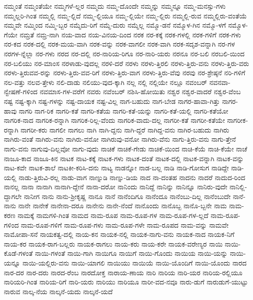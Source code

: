 {ನಮ್ಮಂತೆ
ನಮ್ಮಂತೆಯೇ
ನಮ್ಮಗಳೆ-ಲ್ಲರ
ನಮ್ಮದು
ನಮ್ಮ-ದೊಂದೇ
ನಮ್ಮನ್ನು
ನಮ್ಮನ್ನೂ
ನಮ್ಮ-ಮನಸ್ಸು-ಗಳು
ನಮ್ಮಲ್ಲರಿ-ಗಿಂತ
ನಮ್ಮಲ್ಲಿ
ನಮ್ಮ-ಲ್ಲಿದೆ
ನಮ್ಮ-ಲ್ಲಿಯೂ
ನಮ್ಮ-ಲ್ಲಿಯೇ
ನಮ್ಮ-ಲ್ಲಿರು
ನಮ್ಮಲ್ಲಿ-ರುವ
ನಮ್ಮಲ್ಲಿರು-ವಂತೆಯೆ
ನಮ್ಮವೇ
ನಮ್ಮಿಂದ
ನಮ್ಮಿ-ಬ್ಬರ
ನಮ್ಮೆದು-ರಿಗೆ
ನಮ್ಮೆ-ದುರು
ನಮ್ಮೆಲ್ಲ
ನಮ್ಮೊ-ಡನೆ
ನಮ್ಮೊಳ-ಗಿನ
ನಮ್ಮೊ-ಳಗೆ
ನಮ್ಮೊಳ-ಗೆಯೇ
ನಮ್ರತೆ
ನಮ್ರ-ನಾಗಿ
ನಯ-ವಾದ
ನಯ-ವಿನಯ-ದಿಂದ
ನರಕ
ನರ-ಕಕ್ಕೆ
ನರಕ-ಗಳಲ್ಲಿ
ನರಕ-ಗಳಿಗೆ
ನರಕ-ಗಳು
ನರ-ಕದ
ನರಕ-ದಲ್ಲಿ
ನರಕ-ಮಯ-ವಾಗಿ
ನರಕ-ವನ್ನು
ನರಕ-ವಾಗಲೀ
ನರಕ-ವಾಗಿ
ನರಕ-ಸದೃಶ-ವನ್ನಾಗಿ
ನರ-ಗಳ
ನರಗಳ-ನ್ನೆಲ್ಲಾ
ನರ-ಗಳು
ನರದ
ನರ-ದಲ್ಲಿ
ನರ-ನಾರಿಯ-ರಿಗೂ
ನರ-ನಾರಿ-ಯರು
ನರನೂ
ನರ-ಬಲಿ
ನರಬಲಿ-ಯಿಂದ
ನರ-ಬಲಿಯು
ನರ-ಮಾಂಸ
ನರಳಾಡು-ವುದಲ್ಲ
ನರಳಿ-ದರೆ
ನರಳು
ನರಳು-ತ್ತಿರಲಿ
ನರಳು-ತ್ತಿರು-ವನು
ನರಳು-ತ್ತಿರು-ವರು
ನರಳು-ತ್ತಿರುವವ-ರನ್ನು
ನರಳು-ತ್ತಿರು-ವವ-ರಿಗೆ
ನರಳು-ತ್ತಿರು-ವಾಗ
ನರಳು-ತ್ತಿರು-ವೆವು
ನರವು
ನರ-ಶ್ರೇಷ್ಠನೆ
ನರಿ-ಗಳಿಗೆ
ನಲ-ವತ್ತು
ನಲವ-ತ್ತೇಳು
ನಲಿ-ದಾಡು
ನಲಿಯು-ವುದ-ಕ್ಕಾಗಿ
ನಲ್ಲ
ನಲ್ಲಿ
ನಲ್ಲಿಯೇ
ನಲ್ಲೂ
ನವಂಬರ್
ನವನವಾ-ನ್ವೇಷಣೆ-ಗಳಿಂದ
ನವಮಾಸ-ಗಳ-ವರೆಗೆ
ನವರು
ನವೆಂಬರ್
ನಶಿಸಿ-ಹೋಯಿತು
ನಶ್ವರ
ನಶ್ವರ-ವಾದರೆ
ನಶ್ವರ-ವೆಂಬ
ನಷ್ಟ
ನಷ್ಟ-ಕ್ಕಾಗಿ
ನಷ್ಟ-ಗಳನ್ನು
ನಷ್ಟ-ದಾಯಕ
ನಷ್ಟ-ವಿಲ್ಲ
ನಾಗ-ಬಹುದು
ನಾಗ-ಬೇಡ
ನಾಗರ-ಹಾವಾ-ಗಿತ್ತು
ನಾಗರ-ಹಾವು
ನಾಗರಿ
ನಾಗ-ರಿಕ
ನಾಗರಿ-ಕತೆ
ನಾಗರಿ-ಕತೆಯ
ನಾಗರಿ-ಕತೆ-ಯನ್ನು
ನಾಗರಿ-ಕತೆ-ಯಲ್ಲಿ
ನಾಗರಿ-ಕತೆಯೋ
ನಾಗರಿಕ-ನಾದ
ನಾಗರಿಕ-ರನ್ನಾಗಿ
ನಾಗರಿಕ-ರಿಲ್ಲ-ವೆಂದು
ನಾಗರಿಕ-ವಾದು-ದಲ್ಲ
ನಾಗರೀ-ಕತೆ
ನಾಗರೀ-ಕತೆಯೇ
ನಾಗರೀಕ-ರನ್ನಾಗಿ
ನಾಗರೀ-ಕರು
ನಾಗಲೀ
ನಾಗಲು
ನಾಗಿ
ನಾಗಿ-ದ್ದನು
ನಾಗಿ-ದ್ದರೆ
ನಾಗಿದ್ದ-ವನು
ನಾಗಿರ-ಬಹುದು
ನಾಗಿರು
ನಾಗಿರು-ವಂತೆ
ನಾಗಿರು-ವನು
ನಾಗಿರು-ವನೋ
ನಾಗಿರುವು-ವನೋ
ನಾಗಿರು-ವೆನು
ನಾಗು-ತ್ತಿರು-ವನು
ನಾಗು-ತ್ತೇನೆ
ನಾಗು-ವನು
ನಾಗುವು-ದಿಲ್ಲವೋ
ನಾಗು-ವುದು
ನಾಚಿಕೆ
ನಾಚಿಕೆ-ಗೇಡು
ನಾಚಿಕೆ-ಯಿಂದ
ನಾಚಿ-ಕೆಯೆ
ನಾಚಿ-ಕೆಯೇ
ನಾಚೆ
ನಾಜೂ-ಕಾದ
ನಾಜೂ-ಕಿನ
ನಾಟಕ
ನಾಟ-ಕಕ್ಕೆ
ನಾಟಕ-ಗಳು
ನಾಟಕ-ದಂತೆ
ನಾಟಕ-ದಲ್ಲಿ
ನಾಟಕ-ವನ್ನಾಗಿ
ನಾಟಕ-ವನ್ನು
ನಾಟ-ಕವೇ
ನಾಟಕ-ಶಾಲೆ
ನಾಟಕೀ-ಕರಿಸಿ-ದನು
ನಾಟ್ಯ
ನಾಡನ್ನೋ
ನಾಡ-ಬಲ್ಲ
ನಾಡಿ
ನಾಡಿ-ಗೋಸುಗ
ನಾಡಿದ್ದೇ
ನಾಡಿ-ಯಲ್ಲಿ
ನಾಡು-ತ್ತಿರುವಿ-ರಲ್ಲ
ನಾಡು-ವಾಗ
ನಾಣ್ನುಡಿ
ನಾಣ್ನು-ಡಿಯ
ನಾದ
ನಾ-ದಂತಹ
ನಾದನು
ನಾದರೆ
ನಾದುದ-ರಿಂದ
ನಾನಲ್ಲ
ನಾನಾ
ನಾನಾಗಿ
ನಾನಾಗಿ-ದ್ದೇನೆ
ನಾನಾ-ದರೋ
ನಾನಿಂದು
ನಾನಿದ್ದೆ
ನಾನಿನ್ನು
ನಾನಿನ್ನೂ
ನಾನಿರು-ವುದೇ
ನಾನಿಲ್ಲಿ-ದ್ದಾಗಲೇ
ನಾನೀಗ
ನಾನು
ನಾನು-ಶ್ರೀಕೃಷ್ಣ
ನಾನೂ
ನಾನೆ
ನಾನೆಂದಿಗೂ
ನಾನೆಂದೂ
ನಾನೆಂಬು-ದಿಲ್ಲ
ನಾನೆಂಬುದೇ
ನಾನೆ-ನಾನು
ನಾನೇ
ನಾನೇಕೆ
ನಾನೇನಾ-ದರೂ
ನಾನೇನು
ನಾನೇ-ನೆಂದೆ
ನಾನೊಂದು
ನಾನೊಬ್ಬ
ನಾನೊ-ಬ್ಬನೇ
ನಾಮ
ನಾಮ-ಕರಣ
ನಾಮಕ್ಕೆ
ನಾಮಗಳಿ-ಗಿಂತ
ನಾಮದ
ನಾಮ-ರೂಪ
ನಾಮ-ರೂಪ-ಗಳ
ನಾಮ-ರೂಪ-ಗಳ-ಲ್ಲದೆ
ನಾಮ-ರೂಪ-ಗಳಿಂದ
ನಾಮ-ರೂಪ-ಗಳಿಗೆ
ನಾಮ-ರೂಪ-ಗಳು
ನಾಮ-ರೂಪ-ಗಳೇ
ನಾಮ-ರೂಪದ
ನಾಮ-ವನ್ನು
ನಾಮವೇ
ನಾಮೋಪಾ-ಸನೆ
ನಾಯಕತ್ವ-ದಲ್ಲಿ
ನಾಯ-ಕನ
ನಾಯಕ-ನಲ್ಲಿ
ನಾಯಕ-ನಾಗು-ವನು
ನಾಯಕ-ನಾದ
ನಾಯಕ-ನಿಗೆ
ನಾಯ-ಕರ
ನಾಯಕ-ರಾಗ-ಬಲ್ಲರು
ನಾಯಕ-ರಾಗಲು
ನಾಯ-ಕರು
ನಾಯ-ಕರೇ
ನಾಯಕ-ವರೇಣ್ಯರ
ನಾಯಿ
ನಾಯಿ-ಕೊಡೆ-ಗಳಂತೆ
ನಾಯಿ-ಗಳಂತೆ
ನಾಯಿ-ಗಾಗಿ
ನಾಯಿಗೂ
ನಾಯಿಗೆ
ನಾಯಿ-ಗೊಂದು
ನಾಯಿಯ
ನಾಯಿ-ಯನ್ನು
ನಾಯಿ-ಯನ್ನೂ
ನಾಯಿ-ಯಲ್ಲಿರು-ವನು
ನಾಯಿ-ಯಾಗಲಿ
ನಾಯಿಯು
ನಾಯಿಯೆ
ನಾಯಿ-ಯೊಂದಿಗೆ
ನಾಯಿ-ಯೊಂದು
ನಾರದ
ನಾರ-ದರ
ನಾರ-ದರು
ನಾರದ-ರೆಂಬ
ನಾರದೋಕ್ತ
ನಾರಾಯ-ಣಾಯ
ನಾರಿ
ನಾರಿಯ
ನಾರಿ-ಯರ
ನಾರಿಯ-ರಲ್ಲಿಯೂ
ನಾರಿಯರಿ-ಗಿಂತ
ನಾರಿಯ-ರಿಗೆ
ನಾರಿ-ಯರು
ನಾರಿಯು
ನಾರಿಯೂ
ನಾರೀ-ವದ-ನವೂ
ನಾರು-ಡುಗೆ
ನಾರುಡುಗೆ-ಯುಟ್ಟು
ನಾರುವ
ನಾಲ್ಕ-ನೆಯ
ನಾಲ್ಕನೆ-ಯದು
ನಾಲ್ಕನೆ-ಯದೆ
}
